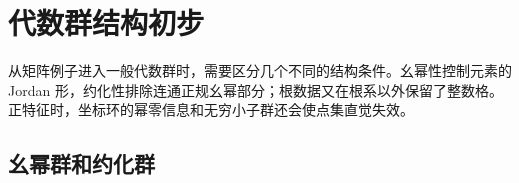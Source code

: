 
\section{代数群结构初步}
\label{b5:sec:2104}


%
%

从矩阵例子进入一般代数群时，需要区分几个不同的结构条件。幺幂性控制元素的 Jordan 形，约化性排除连通正规幺幂部分；根数据又在根系以外保留了整数格。正特征时，坐标环的幂零信息和无穷小子群还会使点集直觉失效。

\subsection{幺幂群和约化群}
\label{b5:subsec:2104:01}

